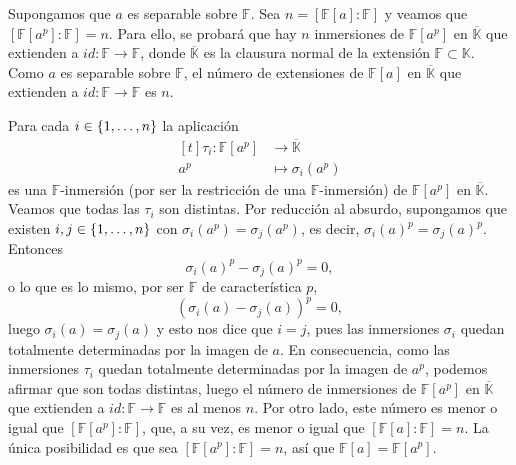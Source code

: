 \documentclass[11pt]{report}
\makeatletter
\renewenvironment{proof}[1][\proofname]{\par
  \pushQED{\qed}%
  \normalfont \topsep\z@skip %
  \trivlist
  \item[\hskip\labelsep
        \itshape
    #1\@addpunct{.}]\ignorespaces
}{%
  \popQED\endtrivlist\@endpefalse
}
\newcommand{\F}{\mathbb F}
\newcommand{\K}{\mathbb K}
\makeatother
\begin{document}
        \begin{proof}
        Supongamos que $a$ es separable sobre $\F$. Sea $n = [\F[a] \colon \F]$ y veamos que $[\F[a^p] \colon \F] = n$. Para ello, se probará que hay $n$ inmersiones de $\F[a^p]$ en $\overline{\K}$ que extienden a $id\colon \F \to \F$, donde $\overline{\K}$ es la clausura normal de la extensión $\F \subset \K$. Como $a$ es separable sobre $\F$, el número de extensiones de $\F[a]$ en $\overline{\K}$ que extienden a $id \colon \F \to \F$ es $n$.
        
        \begin{center}
        \end{center}
        
        Para cada $i \in \{1,\mathellipsis,n\}$ la aplicación
        \[\begin{aligned}[t]
            \tau_i \colon \F[a^p] &\longrightarrow \overline{\K} \\
            a^p &\longmapsto \sigma_i(a^p)
        \end{aligned}\]
        es una $\F$-inmersión (por ser la restricción de una $\F$-inmersión) de $\F[a^p]$ en $\overline{\K}$. Veamos que todas las $\tau_i$ son distintas. Por reducción al absurdo, supongamos que existen $i,j \in \{1,\mathellipsis,n\}$ con $\sigma_i(a^p)=\sigma_j(a^p)$, es decir, $\sigma_i(a)^p=\sigma_j(a)^p$. Entonces
        \[\sigma_i(a)^p-\sigma_j(a)^p =0,\]
        o lo que es lo mismo, por ser $\F$ de característica $p$,
        \[(\sigma_i(a)-\sigma_j(a))^p = 0,\]
        luego $\sigma_i(a) = \sigma_j(a)$ y esto nos dice que $i = j$, pues las inmersiones $\sigma_i$ quedan totalmente determinadas por la imagen de $a$. En consecuencia, como las inmersiones $\tau_i$ quedan totalmente determinadas por la imagen de $a^p$, podemos afirmar que son todas distintas, luego el número de inmersiones de $\F[a^p]$ en $\overline{\K}$ que extienden a $id \colon \F \to \F$ es al menos $n$. Por otro lado, este número es menor o igual que $[\F[a^p] \colon \F]$, que, a su vez, es menor o igual que $[\F[a] \colon \F] = n$. La única posibilidad es que sea $[\F[a^p] \colon \F] = n$, así que $\F[a] = \F[a^p]$.
        

\end{proof}
\end{document}
